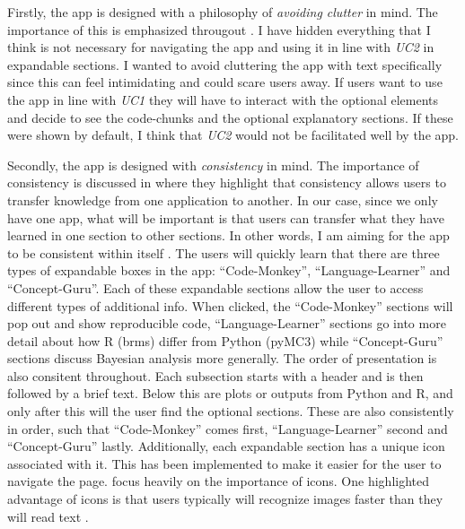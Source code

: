 \documentclass[12pt]{article}
\begin{document}
\vspace{5mm}

Firstly, the app is designed with a philosophy of \emph{avoiding clutter} in mind.
The importance of this is emphasized througout \textcite{mills1992macintosh}.
I have hidden everything that I think is not necessary for navigating the app and
using it in line with \emph{UC2} in expandable sections. I wanted to avoid cluttering the
app with text specifically since this can feel intimidating and could scare users away.
If users want to use the app in line with \emph{UC1} they will have to interact with the optional
elements and decide to see the code-chunks and the optional explanatory sections.
If these were shown by default, I think that \emph{UC2} would not be facilitated well by the app.

\vspace{5mm}

Secondly, the app is designed with \emph{consistency} in mind.
The importance of consistency is discussed in
\textcite[7]{mills1992macintosh}
where they highlight that consistency allows users to transfer knowledge from one
application to another. In our case, since we only have one app, what will be important is
that users can transfer what they have learned in one section to other sections.
In other words, I am aiming for the app to be consistent within itself
\autocite[8]{mills1992macintosh}.
The users will quickly learn that there are three types of expandable boxes in the app:
“Code-Monkey”, “Language-Learner” and “Concept-Guru”. Each of these expandable sections
allow the user to access different types of additional info. When clicked, the “Code-Monkey”
sections will pop out and show reproducible code, “Language-Learner” sections go into more detail
about how R (brms) differ from Python (pyMC3) while “Concept-Guru” sections discuss Bayesian analysis
more generally. The order of presentation is also consitent throughout.
Each subsection starts with a header and is then followed by a brief text.
Below this are plots or outputs from Python and R, and only after this will the user find
the optional sections. These are also consistently in order, such that “Code-Monkey” comes first,
“Language-Learner” second and “Concept-Guru” lastly. Additionally, each expandable section
has a unique icon associated with it. This has been implemented to make it easier for the
user to navigate the page. \textcite[223-255]{mills1992macintosh} focus
heavily on the importance of icons. One highlighted advantage of icons is that users typically
will recognize images faster than they will read text
\autocite[244]{mills1992macintosh}.
\end{document}
